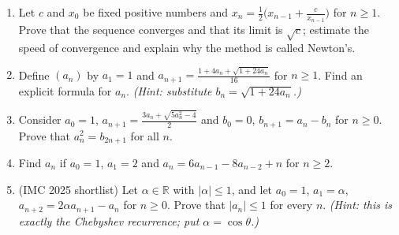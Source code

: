 \documentclass[11pt,a4paper]{article}
\renewcommand{\le}{\leqslant}
\renewcommand{\ge}{\geqslant}
\begin{document}
\begin{enumerate}
\item Let $c$ and $x_0$ be fixed positive numbers and
$x_n=\frac12\bigl(x_{n-1}+\frac c{x_{n-1}}\bigr)$ for $n\ge1$. Prove that the sequence converges
and that its limit is $\sqrt c$; estimate the speed of convergence and explain why the method is
called Newton's.

\item Define $(a_n)$ by $a_1=1$ and $a_{n+1}=\frac{1+4a_n+\sqrt{1+24a_n}}{16}$ for $n\ge1$.
Find an explicit formula for $a_n$. \emph{(Hint: substitute $b_n=\sqrt{1+24a_n}$.)}

\item Consider $a_0=1$, $a_{n+1}=\frac{3a_n+\sqrt{5a_n^2-4}}2$ and $b_0=0$, $b_{n+1}=a_n-b_n$
for $n\ge0$. Prove that $a_n^2=b_{2n+1}$ for all $n$.

\item Find $a_n$ if $a_0=1$, $a_1=2$ and $a_n=6a_{n-1}-8a_{n-2}+n$ for $n\ge2$.

\item (IMC 2025 shortlist) Let $\alpha\in\mathbb R$ with $|\alpha|\le1$, and let $a_0=1$,
$a_1=\alpha$, $a_{n+2}=2\alpha a_{n+1}-a_n$ for $n\ge0$. Prove that $|a_n|\le1$ for every $n$.
\emph{(Hint: this is exactly the Chebyshev recurrence; put $\alpha=\cos\theta$.)}
\end{enumerate}
\end{document}
